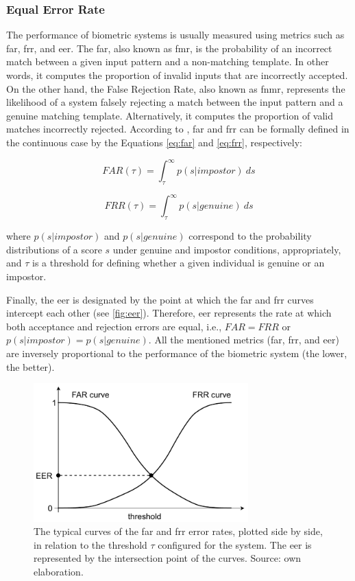 \subsubsection{Equal Error Rate}

The performance of biometric systems is usually measured using metrics such as \acf{far}, \acf{frr}, and \acf{eer}. The \acl{far}, also known as \acf{fmr}, is the probability of an incorrect match between a given input pattern and a non-matching template. In other words, it computes the proportion of invalid inputs that are incorrectly accepted. On the other hand, the False Rejection Rate, also known as \acf{fnmr}, represents the likelihood of a system falsely rejecting a match between the input pattern and a genuine matching template. Alternatively, it computes the proportion of valid matches incorrectly rejected. According to \cite{ross2006handbook}, \acs{far} and \acs{frr} can be formally defined in the continuous case by the Equations \ref{eq:far} and \ref{eq:frr}, respectively:

\begin{equation}
\label{eq:far}
FAR(\tau) = \int_{\tau}^{\infty} p(s|impostor)\ ds
\end{equation}

\begin{equation}
\label{eq:frr}
FRR(\tau) = \int_{\tau}^{\infty} p(s|genuine)\ ds
\end{equation}

\noindent
where $p(s|impostor)$ and $p(s|genuine)$ correspond to the probability distributions of a score $s$ under genuine and impostor conditions, appropriately, and $\tau$ is a threshold for defining whether a given individual is genuine or an impostor.

Finally, the \acs{eer} is designated by the point at which the \acs{far} and \acs{frr} curves intercept each other (see \autoref{fig:eer}). Therefore, \acs{eer} represents the rate at which both acceptance and rejection errors are equal, i.e., $FAR = FRR$ or $p(s|impostor) = p(s|genuine)$. All the mentioned metrics (\acs{far}, \acs{frr}, and \acs{eer}) are inversely proportional to the performance of the biometric system (the lower, the better).

\begin{figure}[h]
\centering
\includegraphics[height=2.1in]{images/metrics/EER.pdf}
\caption{The typical curves of the \acs{far} and \acs{frr} error rates, plotted side by side, in relation to the threshold $\tau$ configured for the system. The \acs{eer} is represented by the intersection point of the curves. Source: own elaboration.}
\label{fig:eer}
\end{figure}

